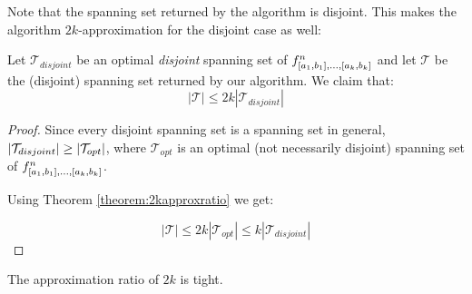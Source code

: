 Note that the spanning set returned by the algorithm
is disjoint.
This makes the algorithm $2k$-approximation
for the disjoint case as well:

\begin{theorem}
Let $\mathcal{T}_{disjoint}$ be an optimal \emph{disjoint}
spanning set of
$f^n_{[a_1, b_1], \ldots, [a_k, b_k]}$
and let $\mathcal{T}$ be the (disjoint)
spanning set returned by our algorithm.
We claim that:
\begin{equation*}
|\mathcal{T}| \leq 2k |\mathcal{T}_{disjoint}|
\end{equation*}
\end{theorem}

\begin{proof}
Since every disjoint spanning set
is a spanning set in general,
$\lvert\mathcal{T}_{disjoint}\rvert \geq
\lvert\mathcal{T}_{opt}\rvert$,
where $\mathcal{T}_{opt}$ is an optimal
(not necessarily disjoint)
spanning set of
$f^n_{[a_1, b_1], \ldots, [a_k, b_k]}$.

Using Theorem \ref{theorem:2kapproxratio} we get:

\begin{equation*}
|\mathcal{T}| \leq 2k |\mathcal{T}_{opt}|
\leq k |\mathcal{T}_{disjoint}|
\end{equation*}
\end{proof}

\begin{theorem}
The approximation ratio of $2k$ is tight.
\end{theorem}

